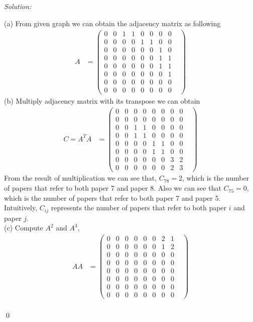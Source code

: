 \documentclass[12pt]{article}
\newenvironment{sol}
    {\emph{Solution:}
    }
    {
    \qed
    }
\begin{document}
\begin{sol}
	(a) From given graph we can obtain the adjacency matrix as following
	\begin{align*}
		A &= \begin{pmatrix}0 & 0 & 1 & 1 & 0 & 0 & 0 & 0 \\ 0 & 0 & 0 & 0 & 1 & 1 & 0 & 0 & \\ 0 & 0 & 0 & 0 & 0 & 0 & 1 & 0 \\ 0 & 0 & 0 & 0 & 0 & 0 & 1 & 1 \\ 0 & 0 &0 & 0 & 0 & 0 & 1 & 1 \\ 0 & 0 & 0 & 0 & 0 & 0 & 0 & 1 \\ 0 & 0 & 0 & 0 & 0 & 0 & 0 & 0 \\ 0 & 0 & 0 & 0 & 0 & 0 & 0 & 0\end{pmatrix}
	\end{align*}
	(b) Multiply adjacency matrix with its transpose we can obtain
	\begin{align*}
		C = A^TA &= \begin{pmatrix}0 & 0 & 0 & 0 & 0 & 0 & 0 & 0 \\ 0 & 0 & 0 & 0 & 0 & 0 & 0 & 0 & \\ 0 & 0 & 1 & 1 & 0 & 0 & 0 & 0 \\ 0 & 0 & 1 & 1 & 0 & 0 & 0 & 0 \\ 0 & 0 & 0 & 0 & 1 & 1 & 0 & 0 \\ 0 & 0 & 0 & 0 & 1 & 1 & 0 & 0 \\ 0 & 0 & 0 & 0 & 0 & 0 & 3 & 2 \\ 0 & 0 & 0 & 0 & 0 & 0 & 2 & 3\end{pmatrix}
	\end{align*} 
	From the result of multiplication we can see that, $ C_{78} = 2 $, which is the number of papers that refer to both paper 7 and paper 8. Also we can see that $ C_{75} = 0 $, which is the number of papers that refer to both paper 7 and paper 5. \\
	Intuitively, $C_{ij}$ represents the number of papers that refer to both paper $ i $ and paper $ j $. \\
	(c) Compute $ A^2 $ and $ A^3 $,
	\begin{align*}
		AA &= \begin{pmatrix}0 & 0 & 0 & 0 & 0 & 0 & 2 & 1 \\ 0 & 0 & 0 & 0 & 0 & 0 & 1 & 2 & \\ 0 & 0 & 0 & 0 & 0 & 0 & 0 & 0 \\ 0 & 0 & 0 & 0 & 0 & 0 & 0 & 0 \\ 0 & 0 & 0 & 0 & 0 & 0 & 0 & 0 \\ 0 & 0 & 0 & 0 & 0 & 0 & 0 & 0 \\ 0 & 0 & 0 & 0 & 0 & 0 & 0 & 0 \\ 0 & 0 & 0 & 0 & 0 & 0 & 0 & 0\end{pmatrix}\\

\end{align*}
\end{sol}
\end{document}
